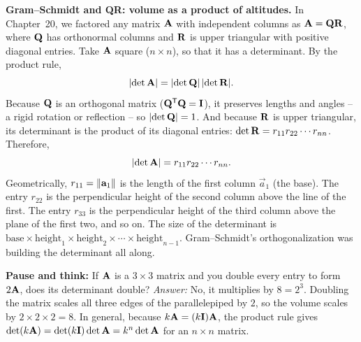 \begin{connectionbox}
\textbf{Gram--Schmidt and QR: volume as a product of altitudes.}
In Chapter~20, we factored any matrix $\mathbf{A}$ with independent columns as
$\mathbf{A} = \mathbf{Q}\mathbf{R}$, where $\mathbf{Q}$ has orthonormal columns and $\mathbf{R}$ is
upper triangular with positive diagonal entries. Take $\mathbf{A}$ square ($n\times n$), so
that it has a determinant. By the
product rule,
\[
  \lvert\det\mathbf{A}\rvert = \lvert\det\mathbf{Q}\rvert\,\lvert\det\mathbf{R}\rvert.
\]
Because $\mathbf{Q}$ is an orthogonal matrix ($\mathbf{Q}^{\mathsf{T}}\mathbf{Q} = \mathbf{I}$), it preserves
lengths and angles -- a rigid rotation or reflection -- so $\lvert\det\mathbf{Q}\rvert = 1$. And
because $\mathbf{R}$ is upper triangular, its determinant is the product of its
diagonal entries: $\det\mathbf{R} = r_{11} r_{22} \cdots r_{nn}$. Therefore,
\[
  \lvert\det\mathbf{A}\rvert = r_{11} r_{22} \cdots r_{nn}.
\]
Geometrically, $r_{11} = \lVert\mathbf{a}_1\rVert$ is the length of the
first column $\vec a_1$ (the base). The entry $r_{22}$ is the perpendicular height of the second
column above the line of the first. The entry $r_{33}$ is the perpendicular height of the third
column above the plane of the first two, and so on. The size of the determinant is
$\text{base} \times \text{height}_1 \times \text{height}_2 \times \cdots \times \text{height}_{n-1}$.
Gram--Schmidt's orthogonalization was building the determinant all along.
\end{connectionbox}

\begin{recoverybox}
\textbf{Pause and think:} If $\mathbf{A}$ is a $3\times 3$ matrix and you double every entry to form $2\mathbf{A}$, does its determinant double?
\emph{Answer:} No, it multiplies by $8 = 2^3$. Doubling the matrix scales all three edges of the parallelepiped by $2$, so the volume scales by $2\times 2\times 2 = 8$. In general, because $k\mathbf{A} = (k\mathbf{I})\mathbf{A}$, the product rule gives $\det(k\mathbf{A}) = \det(k\mathbf{I})\det\mathbf{A} = k^n\det\mathbf{A}$ for an $n\times n$ matrix.
\end{recoverybox}

